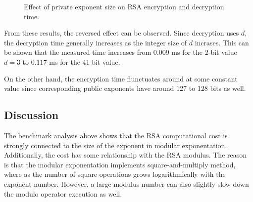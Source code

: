 \documentclass[11pt,a4paper]{article}
\begin{document}
\begin{figure}[ht]
    \centering

    \caption{Effect of private exponent size on RSA encryption and decryption time.}
    \label{fig:private-exponent-time}
\end{figure}

From these results, the reversed effect can be observed. Since decryption uses $d$, the decryption time generally increases as the integer size of $d$ incrases. This can be shown that the measured time increases from $0.009$ ms for the 2-bit value $d=3$ to $0.117$ ms for the 41-bit value.

On the other hand, the encryption time flunctuates around at some constant value since corresponding public exponents have around 127 to 128 bits as well. 

\subsection*{Discussion}

The benchmark analysis above shows that the RSA computational cost is strongly connected to the size of the exponent in modular exponentation. Additionally, the cost has some relationship with the RSA modulus. The reason is that the modular exponentation implements square-and-multiply method, where as the number of square operations grows logarithmically with the exponent number. However, a large modulus number can also slightly slow down the modulo operator execution as well.
\end{document}
